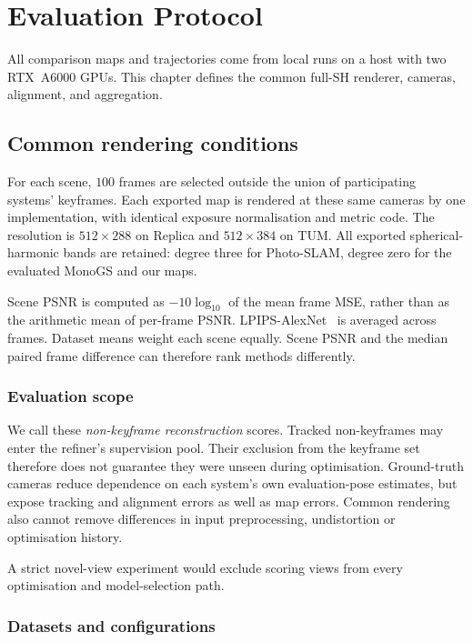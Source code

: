 \chapter{Evaluation Protocol}
\label{ch:protocol}

All comparison maps and trajectories come from local runs on a host with two
RTX~A6000 GPUs. This chapter defines the common full-SH renderer, cameras,
alignment, and aggregation.



\section{Common rendering conditions}

For each scene, $100$ frames are selected outside the union of participating
systems' keyframes. Each exported map is rendered at these same cameras by
one implementation, with identical exposure normalisation and metric code.
The resolution is $512\times288$ on Replica and $512\times384$ on TUM.
All exported spherical-harmonic bands are retained: degree three for
Photo-SLAM, degree zero for the evaluated MonoGS and our maps.

Scene PSNR is computed as $-10\log_{10}$ of the mean frame MSE, rather than
as the arithmetic mean of per-frame PSNR. LPIPS-AlexNet~\cite{zhang2018lpips}
is averaged across frames. Dataset means weight each scene equally.
Scene PSNR and the median paired frame difference can therefore rank methods
differently.

\subsection{Evaluation scope}

We call these \emph{non-keyframe reconstruction} scores. Tracked
non-keyframes may enter the refiner's supervision pool. Their exclusion from
the keyframe set therefore does not guarantee they were unseen during
optimisation. Ground-truth cameras reduce dependence on each system's own
evaluation-pose estimates, but expose tracking and alignment errors as well
as map errors. Common rendering also cannot remove differences in input
preprocessing, undistortion or optimisation history.

A strict novel-view experiment would exclude scoring views from every
optimisation and model-selection path.

\subsection{Datasets and configurations}

